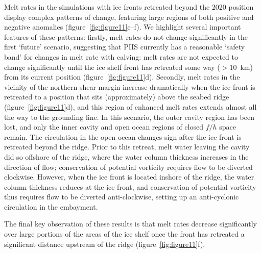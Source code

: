 \documentclass[draft]{agujournal2019}
\begin{document}
Melt rates in the simulations with ice fronts retreated beyond the 2020 position display complex patterns of change, featuring large regions of both positive and negative anomalies (figure~\ref{fig:figure11}c--f). We highlight several important features of these patterns: firstly, melt rates do not change significantly in the first `future' scenario, suggesting that PIIS currently has a reasonable `safety band' for changes in melt rate with calving: melt rates are not expected to change significantly until the ice shelf front has retreated some way ($>$10~km) from its current position (figure~\ref{fig:figure11}d). Secondly, melt rates in the vicinity of the northern shear margin increase dramatically when the ice front is retreated to a position that sits (approximately) above the seabed ridge (figure~\ref{fig:figure11}d), and this region of enhanced melt rates extends almost all the way to the grounding line. In this scenario, the outer cavity region has been lost, and only the inner cavity and open ocean regions of closed $f/h$ space remain. %
The circulation in the open ocean changes sign after the ice front is retreated beyond the ridge. Prior to this retreat, melt water leaving the cavity did so offshore of the ridge, where the water column thickness increases in the direction of flow; conservation of potential vorticity requires flow to be diverted clockwise. However, when the ice front is located inshore of the ridge, the water column thickness reduces at the ice front, and conservation of potential vorticity thus requires flow to be diverted anti-clockwise, setting up an anti-cyclonic circulation in the embayment.

The final key observation of these results is that melt rates decrease significantly over large portions of the areas of the ice shelf once the front has retreated a significant distance upstream of the ridge (figure~\ref{fig:figure11}f).
\end{document}
